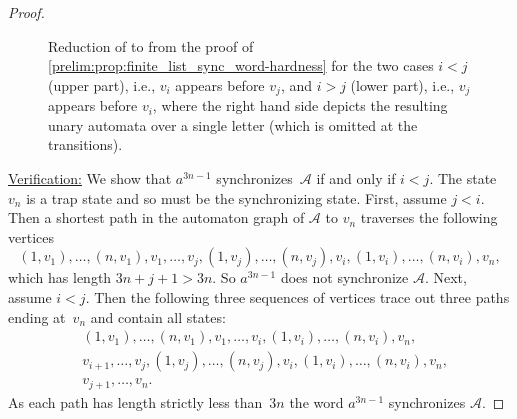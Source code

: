 \begin{proof}
\begin{figure}[ht]
{}
		\caption[Reduction of \ORD to \DFASW.]{Reduction of \ORD to \DFASW from the proof of 
			\cref{prelim:prop:finite_list_sync_word-hardness}
			for the two cases $i < j$  (upper part), i.e., $v_i$ appears before $v_j$,
			and $i > j$ (lower part), i.e., $v_j$ appears before $v_i$,  where the right hand side
			depicts the resulting unary automata over a single letter (which is omitted
			at the transitions).}
		\label{fig:reductionORD}
	\end{figure}	
	
	\medskip 
	\noindent\underline{Verification:} We show that $a^{3n - 1}$ synchronizes~$\mathcal A$
	if and only if $i < j$. The state $v_n$ is a trap state
	and so must be the synchronizing state.	
	First, assume $j < i$. Then a shortest path in 
	the automaton graph of $\mathcal A$ to $v_n$ traverses the following vertices
	\[
	(1,v_1), \ldots, (n, v_1), v_1, \ldots, v_j, 
	(1,v_j), \ldots, (n, v_j), v_i, (1, v_i), \ldots, (n, v_i), v_n,
	\]
	which has length $3n + j + 1 > 3n$. So $a^{3n-1}$ does not synchronize $\mathcal A$.
	Next, assume $i < j$. 
	Then the following three sequences of vertices trace out three paths ending at~$v_n$ and contain all states:
	\begin{align*}
		& (1,v_1), \ldots, (n, v_1), v_1, \ldots, v_i, (1,v_i), \ldots, (n, v_i), v_n, \\
		& v_{i+1}, \ldots, v_j, (1,v_j), \ldots, (n,v_j), v_i, (1, v_i), \ldots, (n, v_i), v_n, \\
		& v_{j+1},\ldots,v_n.
	\end{align*}
	As each path has length strictly less than~$3n$ 
	the word $a^{3n-1}$ synchronizes $\mathcal A$.		
\end{proof} 


